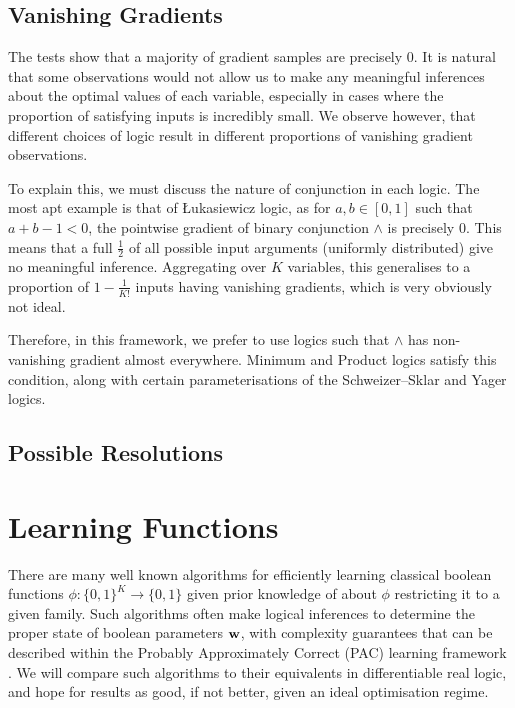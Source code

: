 \subsection{Vanishing Gradients}
\label{section:tnormzerograd}

The tests show that a majority of gradient samples are precisely $0$. It is natural that some observations would not allow us to make any meaningful inferences about the optimal values of each variable, especially in cases where the proportion of satisfying inputs is incredibly small. We observe however, that different choices of logic result in different proportions of vanishing gradient observations.

To explain this, we must discuss the nature of conjunction in each logic. The most apt example is that of Łukasiewicz logic, as for $a, b \in [0,1]$ such that $a + b - 1 < 0$, the pointwise gradient of binary conjunction $\land$ is precisely $0$. This means that a full $\frac{1}{2}$ of all possible input arguments (uniformly distributed) give no meaningful inference. Aggregating over $K$ variables, this generalises to a proportion of $1 - \frac{1}{K!}$ inputs having vanishing gradients, which is very obviously not ideal.

Therefore, in this framework, we prefer to use logics such that $\land$ has non-vanishing gradient almost everywhere. Minimum and Product logics satisfy this condition, along with certain parameterisations of the Schweizer–Sklar and Yager logics.

\subsection{Possible Resolutions}



\section{Learning Functions}

There are many well known algorithms for efficiently learning classical boolean functions $\phi : \{0,1\}^K \to \{0,1\}$ given prior knowledge of about $\phi$ restricting it to a given family. Such algorithms often make logical inferences to determine the proper state of boolean parameters $\mathbf{w}$, with complexity guarantees that can be described within the Probably Approximately Correct (PAC) learning framework \cite{clt}. We will compare such algorithms to their equivalents in differentiable real logic, and hope for results as good, if not better, given an ideal optimisation regime. 

